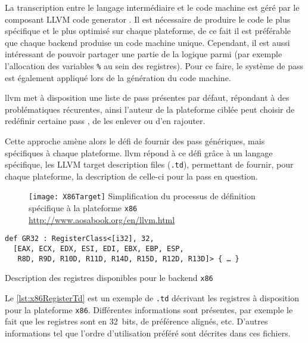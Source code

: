 La transcription entre le langage intermédiaire et le code machine est géré par le composant \og LLVM code generator \fg. Il est nécessaire de produire le code le plus spécifique et le plus optimisé sur chaque plateforme, de ce fait il est préférable que chaque \og backend \fg produise un code machine unique. Cependant, il est aussi intéressant de pouvoir partager une partie de la logique parmi (par exemple l'allocation des variables \texttt{\%} au sein des registres). Pour ce faire, le système de \og pass \fg est également appliqué lors de la génération du code machine.

\gls{llvm} met à disposition une liste de \og pass \fg présentes par défaut, répondant à des problématiques récurentes, ainsi l'auteur de la plateforme ciblée peut choisir de redéfinir certaine \og pass \fg, de les enlever ou d'en rajouter.

Cette approche amène alors le défi de fournir des \og pass \fg génériques, mais spécifiques à chaque plateforme. \gls{llvm} répond à ce défi grâce à un langage spécifique, les \og LLVM target description files \fg (\texttt{.td}), permettant de fournir, pour chaque plateforme, la description de celle-ci pour la \og pass \fg en question.

\begin{figure}[H]
	\centering
	\texttt{[image: X86Target]}
	{Simplification du processus de définition spécifique à la plateforme \texttt{x86}}
	{\url{http://www.aosabook.org/en/llvm.html}}
	\label{fig:X86Target}
\end{figure}

\vfill

\begin{listing}
	\begin{verbatim}
def GR32 : RegisterClass<[i32], 32,
  [EAX, ECX, EDX, ESI, EDI, EBX, EBP, ESP,
   R8D, R9D, R10D, R11D, R14D, R15D, R12D, R13D]> { … }
	\end{verbatim}
	\caption{Description des registres disponibles pour le \og backend \fg \texttt{x86}}
	\label{lst:x86RegisterTd}
\end{listing}

Le \autoref{lst:x86RegisterTd} est un exemple de \texttt{.td} décrivant les registres à disposition pour la plateforme \texttt{x86}. Différentes informations sont présentes, par exemple le fait que les registres sont en 32~bits, de préférence alignés, etc. D'autres informations tel que l'ordre d'utilisation préféré sont décrites dans ces fichiers.

